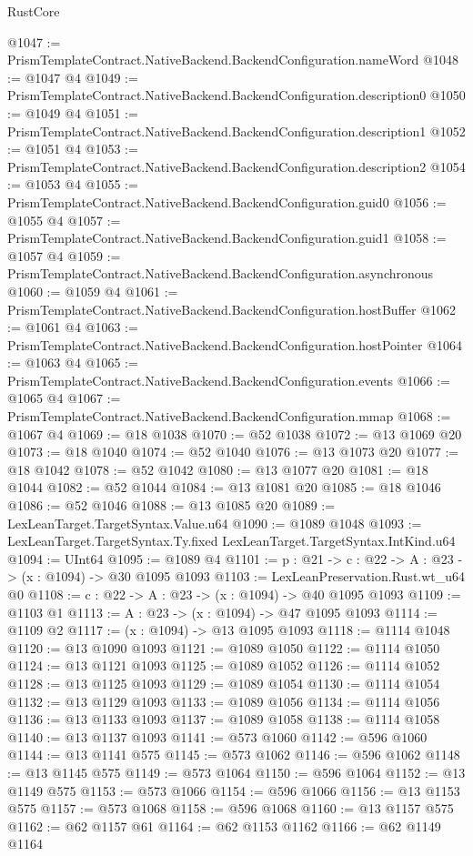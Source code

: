 \begin{lexlean}{RustCore}
\begin{coremodule}
@1047 := PrismTemplateContract.NativeBackend.BackendConfiguration.nameWord
@1048 := @1047 @4
@1049 := PrismTemplateContract.NativeBackend.BackendConfiguration.description0
@1050 := @1049 @4
@1051 := PrismTemplateContract.NativeBackend.BackendConfiguration.description1
@1052 := @1051 @4
@1053 := PrismTemplateContract.NativeBackend.BackendConfiguration.description2
@1054 := @1053 @4
@1055 := PrismTemplateContract.NativeBackend.BackendConfiguration.guid0
@1056 := @1055 @4
@1057 := PrismTemplateContract.NativeBackend.BackendConfiguration.guid1
@1058 := @1057 @4
@1059 := PrismTemplateContract.NativeBackend.BackendConfiguration.asynchronous
@1060 := @1059 @4
@1061 := PrismTemplateContract.NativeBackend.BackendConfiguration.hostBuffer
@1062 := @1061 @4
@1063 := PrismTemplateContract.NativeBackend.BackendConfiguration.hostPointer
@1064 := @1063 @4
@1065 := PrismTemplateContract.NativeBackend.BackendConfiguration.events
@1066 := @1065 @4
@1067 := PrismTemplateContract.NativeBackend.BackendConfiguration.mmap
@1068 := @1067 @4
@1069 := @18 @1038
@1070 := @52 @1038
@1072 := @13 @1069 @20
@1073 := @18 @1040
@1074 := @52 @1040
@1076 := @13 @1073 @20
@1077 := @18 @1042
@1078 := @52 @1042
@1080 := @13 @1077 @20
@1081 := @18 @1044
@1082 := @52 @1044
@1084 := @13 @1081 @20
@1085 := @18 @1046
@1086 := @52 @1046
@1088 := @13 @1085 @20
@1089 := LexLeanTarget.TargetSyntax.Value.u64
@1090 := @1089 @1048
@1093 := LexLeanTarget.TargetSyntax.Ty.fixed LexLeanTarget.TargetSyntax.IntKind.u64
@1094 := UInt64
@1095 := @1089 @4
@1101 := {p : @21} -> {c : @22} -> {A : @23} -> (x : @1094) -> @30 @1095 @1093
@1103 := LexLeanPreservation.Rust.wt_u64 @0
@1108 := {c : @22} -> {A : @23} -> (x : @1094) -> @40 @1095 @1093
@1109 := @1103 @1
@1113 := {A : @23} -> (x : @1094) -> @47 @1095 @1093
@1114 := @1109 @2
@1117 := (x : @1094) -> @13 @1095 @1093
@1118 := @1114 @1048
@1120 := @13 @1090 @1093
@1121 := @1089 @1050
@1122 := @1114 @1050
@1124 := @13 @1121 @1093
@1125 := @1089 @1052
@1126 := @1114 @1052
@1128 := @13 @1125 @1093
@1129 := @1089 @1054
@1130 := @1114 @1054
@1132 := @13 @1129 @1093
@1133 := @1089 @1056
@1134 := @1114 @1056
@1136 := @13 @1133 @1093
@1137 := @1089 @1058
@1138 := @1114 @1058
@1140 := @13 @1137 @1093
@1141 := @573 @1060
@1142 := @596 @1060
@1144 := @13 @1141 @575
@1145 := @573 @1062
@1146 := @596 @1062
@1148 := @13 @1145 @575
@1149 := @573 @1064
@1150 := @596 @1064
@1152 := @13 @1149 @575
@1153 := @573 @1066
@1154 := @596 @1066
@1156 := @13 @1153 @575
@1157 := @573 @1068
@1158 := @596 @1068
@1160 := @13 @1157 @575
@1162 := @62 @1157 @61
@1164 := @62 @1153 @1162
@1166 := @62 @1149 @1164

\end{coremodule}
\end{lexlean}
